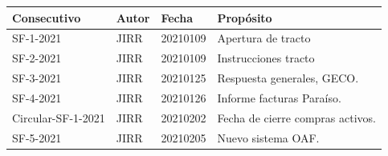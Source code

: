 \documentclass[12pt]{article}
\begin{document}
    

\begin{table}[]
\centering
\begin{tabular}{@{}llll@{}}
\toprule
Consecutivo & Autor & Fecha & Propósito \\ 
\midrule
      SF-1-2021      &JIRR     &20210109       &Apertura de tracto \\
      SF-2-2021      &JIRR     &20210109       &Instrucciones tracto \\ 
      SF-3-2021      &JIRR     &20210125       &Respuesta generales, GECO. \\ 
      SF-4-2021      &JIRR     &20210126       &Informe facturas Paraíso. \\ 
      Circular-SF-1-2021      &JIRR     &20210202       &Fecha de cierre compras activos. \\ 
      SF-5-2021      &JIRR     &20210205 &Nuevo sistema OAF. \\ 
      \bottomrule
\end{tabular}
\end{table}
\end{document}
